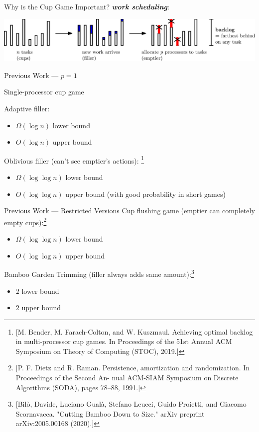 \documentclass[xcolor=x11names, svgnames, rgb]{beamer}
\newcommand{\defn}[1]       {{\textit{\textbf{\boldmath #1}}}}
\begin{document}
\begin{frame}[t]{Why is the Cup Game Important?}
  \vspace{1cm}
  \defn{work scheduling}:
  \vspace{1cm}

  \includegraphics[width=\linewidth]{workScheduling/workScheduling.eps}
\end{frame}

\begin{frame}[t]{Previous Work --- $p=1$}

  Single-processor cup game

  Adaptive filler:
  \begin{itemize}
    \item $\Omega(\log n)$ lower bound
    \item $O(\log n)$ upper bound
  \end{itemize}

  Oblivious filler (can't see emptier's actions):
  \footnote{[M. Bender, M. Farach-Colton, and W. Kuszmaul. Achieving optimal backlog in multi-processor cup games. In Proceedings of the 51st Annual ACM Symposium on Theory of Computing (STOC), 2019.]}
  \begin{itemize}
    \item $\Omega(\log\log n)$ lower bound
    \item $O(\log\log n)$ upper bound (with good probability in short games)
  \end{itemize}
\end{frame}

\begin{frame}[t]{Previous Work --- Restricted Versions}
  Cup flushing game (emptier can completely empty cups):\footnote{[P. F. Dietz and R. Raman. Persistence, amortization and randomization. In Proceedings of the Second An- nual ACM-SIAM Symposium on Discrete Algorithms (SODA), pages 78–88, 1991.]}
\begin{itemize}
  \item $\Omega(\log \log n)$ lower bound
  \item $O(\log \log n)$ upper bound
\end{itemize}

Bamboo Garden Trimming (filler always adds same amount):\footnote{[Bilò, Davide, Luciano Gualà, Stefano Leucci, Guido Proietti, and Giacomo Scornavacca. "Cutting Bamboo Down to Size." arXiv preprint arXiv:2005.00168 (2020).]}
\begin{itemize}
  \item $2$ lower bound
  \item $2$ upper bound
\end{itemize}


\end{frame}
\end{document}

